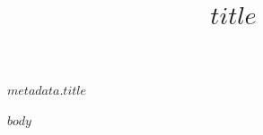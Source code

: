 \documentclass[
]{article}
\title{\vspace{-8ex}$title$\vspace{-3ex}}
\begin{document}
$metadata.title$

$body$
\end{document}

